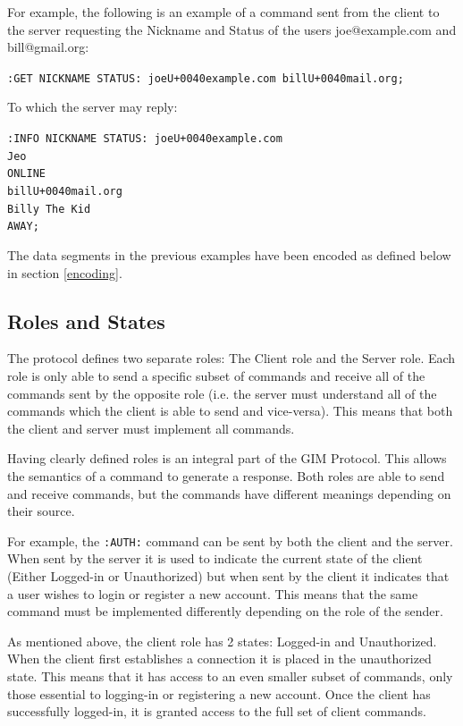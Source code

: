 For example, the following is an example of a command sent from the client to the server requesting the Nickname and Status of the users joe@example.com and bill@gmail.org:

\texttt{:GET NICKNAME STATUS: joe\SLASH U+0040example.com bill\SLASH U+0040mail.org;}

To which the server may reply:

\texttt{:INFO NICKNAME STATUS: joe\SLASH U+0040example.com\\
Jeo\\
ONLINE\\
bill\SLASH U+0040mail.org\\
Billy The Kid\\
AWAY;}

The data segments in the previous examples have been encoded as defined below in section \ref{encoding}.

\subsection{Roles and States}

The protocol defines two separate roles: The Client role and the Server role. Each role is only able to send a specific subset of commands and receive all of the commands sent by the opposite role (i.e. the server must understand all of the commands which the client is able to send and vice-versa). This means that both the client and server must implement all commands.

Having clearly defined roles is an integral part of the GIM Protocol. This allows the semantics of a command to generate a response. Both roles are able to send and receive commands, but the commands have different meanings depending on their source. 

For example, the \texttt{:AUTH:} command can be sent by both the client and the server. When sent by the server it is used to indicate the current state of the client (Either Logged-in or Unauthorized) but when sent by the client it indicates that a user wishes to login or register a new account. This means that the same command must be implemented differently depending on the role of the sender.

As mentioned above, the client role has 2 states: Logged-in and Unauthorized. When the client first establishes a connection it is placed in the unauthorized state. This means that it has access to an even smaller subset of commands, only those essential to logging-in or registering a new account. Once the client has successfully logged-in, it is granted access to the full set of client commands.


